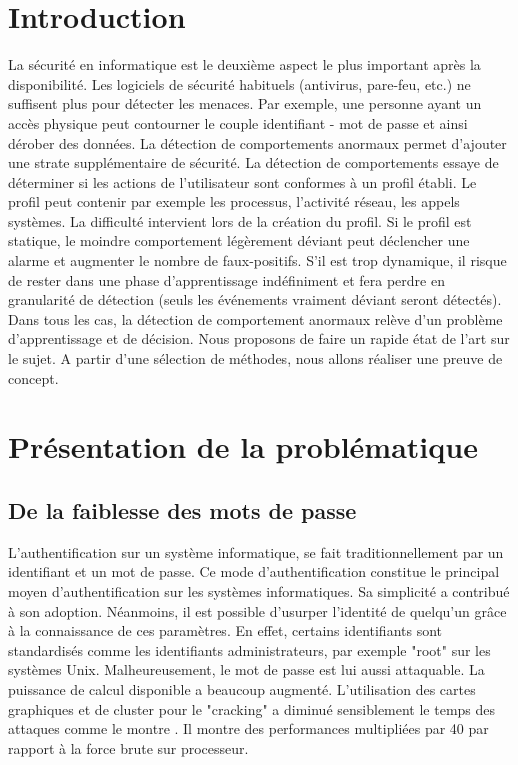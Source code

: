 \documentclass[conference,compsoc]{IEEEtran}
\begin{document}
\section{Introduction}
La sécurité en informatique est le deuxième aspect le plus important après la disponibilité. Les logiciels de sécurité habituels (antivirus, pare-feu, etc.) ne suffisent plus pour détecter les menaces. Par exemple, une personne ayant un accès physique peut contourner le couple identifiant - mot de passe et ainsi dérober des données. La détection de comportements anormaux permet d'ajouter une strate supplémentaire de sécurité. La détection de comportements essaye de déterminer si les actions de l'utilisateur sont conformes à un profil établi. Le profil peut contenir par exemple les processus, l'activité réseau, les appels systèmes. La difficulté intervient lors de la création du profil. Si le profil est statique, le moindre comportement légèrement déviant peut déclencher une alarme et augmenter le nombre de faux-positifs. S'il est trop dynamique, il risque de rester dans une phase d'apprentissage indéfiniment et fera perdre en granularité de détection (seuls les événements vraiment déviant seront détectés). Dans tous les cas, la détection de comportement anormaux relève d'un problème d'apprentissage et de décision. Nous proposons de faire un rapide état de l'art sur le sujet. A partir d'une sélection de méthodes, nous allons réaliser une preuve de concept.

\section{Présentation de la problématique}

\subsection{De la faiblesse des mots de passe}

L'authentification sur un système informatique, se fait traditionnellement par un identifiant et un mot de passe. Ce mode d'authentification constitue le principal moyen d'authentification sur les systèmes informatiques. Sa simplicité a contribué à son adoption. Néanmoins, il est possible d'usurper l'identité de quelqu'un grâce à la connaissance de ces paramètres. En effet, certains identifiants sont standardisés comme les identifiants administrateurs, par exemple "root" sur les systèmes Unix. Malheureusement, le mot de passe est lui aussi attaquable. La puissance de calcul disponible a beaucoup augmenté. L'utilisation des cartes graphiques et de cluster pour le "cracking" a diminué sensiblement le temps des attaques comme le montre \cite{6507505}. Il montre des performances multipliées par 40 par rapport à la force brute sur processeur.
\end{document}

